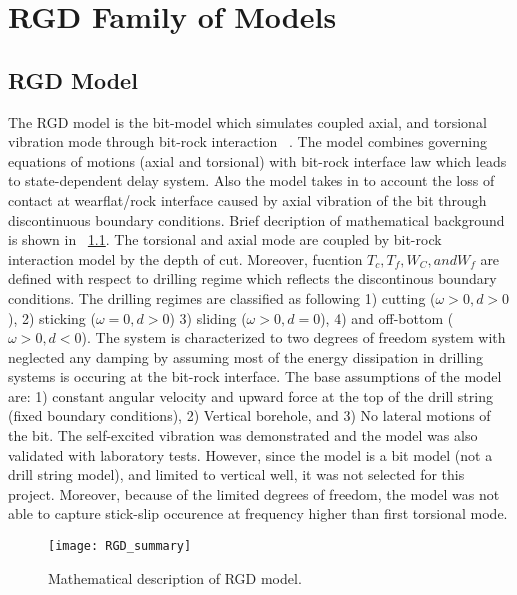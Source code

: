 \chapter{RGD Family of Models}
\label{ch:rgdmodels}

\section{RGD Model}

The RGD model is the bit-model which simulates coupled axial, and torsional vibration mode through bit-rock interaction ~\cite{ref:richard2007a}. The model combines governing equations of motions (axial and torsional) with bit-rock interface law which leads to state-dependent delay system. Also the model takes in to account the loss of contact at wearflat/rock interface caused by axial vibration of the bit through discontinuous boundary conditions. Brief decription of mathematical background is shown in \figurename~\ref{figure_RGD_Summary}. The torsional and axial mode are coupled by bit-rock interaction model by the depth of cut. Moreover, fucntion $T_c, T_f, W_C, and W_f$ are defined with respect to drilling regime which reflects the discontinous boundary conditions. The drilling regimes are classified as following 1) cutting ($\omega>0, d>0$), 2) sticking ($\omega=0, d>0$) 3) sliding ($\omega>0, d=0$), 4) and off-bottom ($\omega>0, d<0$). The system is characterized to two degrees of freedom system with neglected any damping by assuming most of the energy dissipation in drilling systems is occuring at the bit-rock interface. The base assumptions of the model are: 1) constant angular velocity and upward force at the top of the drill string (fixed boundary conditions), 2) Vertical borehole, and 3) No lateral motions of the bit. The self-excited vibration was demonstrated and the model was also validated with laboratory tests. However, since the model is a bit model (not a drill string model), and limited to vertical well, it was not selected for this project. Moreover, because of the limited degrees of freedom, the model was not able to capture stick-slip occurence at frequency higher than first torsional mode. 

\begin{figure}[!hbt]
  \centering
  \texttt{[image: RGD\_summary]}
  \caption[Mathematical description of RGD model]{Mathematical description of RGD model.}\label{figure_RGD_Summary}
\end{figure}

